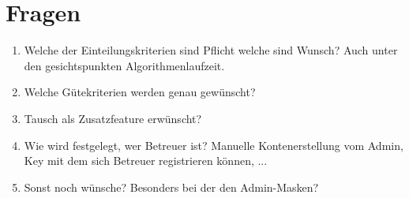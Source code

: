 \documentclass[parskip=full]{scrartcl}
\begin{document}
\section{Fragen}
\begin{enumerate}
  \item Welche der Einteilungskriterien sind Pflicht welche sind Wunsch? Auch
  unter den gesichtspunkten Algorithmenlaufzeit.

  \item Welche Gütekriterien werden genau gewünscht?
  \item Tausch als Zusatzfeature erwünscht?
  \item Wie wird festgelegt, wer Betreuer ist? Manuelle Kontenerstellung vom Admin, Key mit dem sich Betreuer registrieren können, ...

  
  
  
  \item Sonst noch wünsche? Besonders bei der den Admin-Masken?
\end{enumerate}
\end{document}
